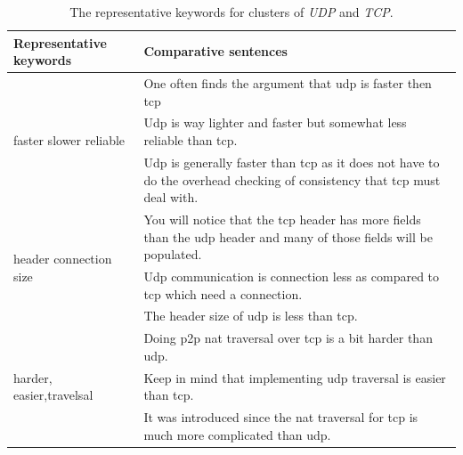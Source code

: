 \begin{table}
	\centering
	\caption{The representative keywords for clusters of \textit{UDP} and \textit{TCP}.}
	\vspace{-3mm}
	\setlength{\tabcolsep}{0.01em}
	\begin{tabular}{l|l}
	\hline
	\textbf{Representative keywords} & \textbf{Comparative sentences} \\ \hline
	\multirow{3}{*}{faster slower reliable} & One often finds the argument that udp is faster then tcp \\ & Udp is way lighter and faster but somewhat less reliable than tcp. \\ & Udp is generally faster than tcp as it does not have to do the overhead checking of consistency that tcp must deal with.\\ \hline
	\multirow{3}{*}{header connection size} & You will notice that the tcp header has more fields than the udp header and many of those fields will be populated. \\ & Udp communication is connection less as compared to tcp which need a connection. \\ & The header size of udp is less than tcp. \\ \hline
	\multirow{3}{*}{harder, easier,travelsal} & Doing p2p nat traversal over tcp is a bit harder than udp. \\ & Keep in mind that implementing udp traversal is easier than tcp. \\ & It was introduced since the nat traversal for tcp is much more complicated than udp. \\ \hline
	\end{tabular}
	\vspace{-1mm}
	\label{tab:aspects}
\end{table}



